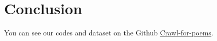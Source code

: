 \section{Conclusion} \label{sec:concl}

You can see our codes and dataset on the Github \href{https://github.com/yashen32768/Crawl-for-poems}{Crawl-for-poems}.